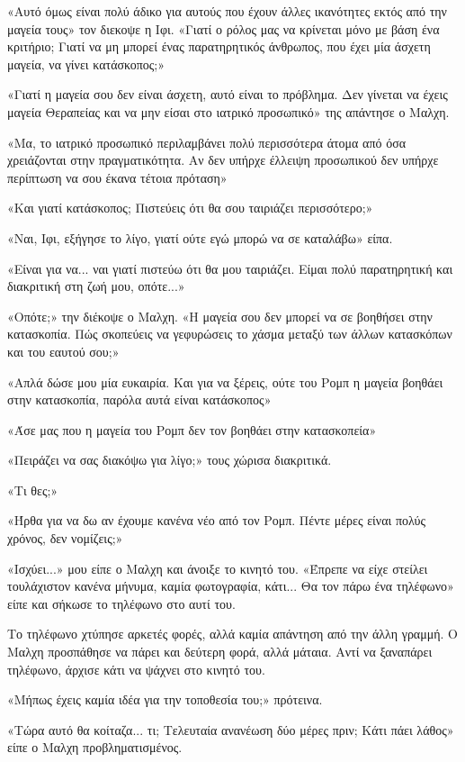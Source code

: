 \documentclass[12pt,twoside, openany]{book}
\begin{document}
«Αυτό όμως είναι πολύ άδικο για αυτούς που έχουν άλλες ικανότητες εκτός από την μαγεία τους» τον διεκοψε η Ιφι. «Γιατί ο ρόλος μας να κρίνεται μόνο με βάση ένα κριτήριο; Γιατί να μη μπορεί ένας παρατηρητικός άνθρωπος, που έχει μία άσχετη μαγεία, να γίνει κατάσκοπος;»

«Γιατί η μαγεία σου δεν είναι άσχετη, αυτό είναι το πρόβλημα. Δεν γίνεται να έχεις μαγεία Θεραπείας και να μην είσαι στο ιατρικό προσωπικό» της απάντησε ο Μαλχη.

«Μα, το ιατρικό προσωπικό περιλαμβάνει πολύ περισσότερα άτομα από όσα χρειάζονται στην πραγματικότητα. Αν δεν υπήρχε έλλειψη προσωπικού δεν υπήρχε περίπτωση να σου έκανα τέτοια πρόταση»

«Και γιατί κατάσκοπος; Πιστεύεις ότι θα σου ταιριάζει περισσότερο;»

«Ναι, Ιφι, εξήγησε το λίγο, γιατί ούτε εγώ μπορώ να σε καταλάβω» είπα.

«Είναι για να... ναι γιατί πιστεύω ότι θα μου ταιριάζει. Είμαι πολύ παρατηρητική και διακριτική στη ζωή μου, οπότε...»

«Οπότε;» την διέκοψε ο Μαλχη. «Η μαγεία σου δεν μπορεί να σε βοηθήσει στην κατασκοπία. Πώς σκοπεύεις να γεφυρώσεις το χάσμα μεταξύ των άλλων κατασκόπων και του εαυτού σου;»

«Απλά δώσε μου μία ευκαιρία. Και για να ξέρεις, ούτε του Ρομπ η μαγεία βοηθάει στην κατασκοπία, παρόλα αυτά είναι κατάσκοπος»

«Άσε μας που η μαγεία του Ρομπ δεν τον βοηθάει στην κατασκοπεία»

«Πειράζει να σας διακόψω για λίγο;» τους χώρισα διακριτικά.

«Τι θες;»

«Ήρθα για να δω αν έχουμε κανένα νέο από τον Ρομπ. Πέντε μέρες είναι πολύς χρόνος, δεν νομίζεις;»

«Ισχύει...» μου είπε ο Μαλχη και άνοιξε το κινητό του. «Έπρεπε να είχε στείλει τουλάχιστον κανένα μήνυμα, καμία φωτογραφία, κάτι... Θα τον πάρω ένα τηλέφωνο» είπε και σήκωσε το τηλέφωνο στο αυτί του.

Το τηλέφωνο χτύπησε αρκετές φορές, αλλά καμία απάντηση από την άλλη γραμμή. Ο Μαλχη προσπάθησε να πάρει και δεύτερη φορά, αλλά μάταια. Αντί να ξαναπάρει τηλέφωνο, άρχισε κάτι να ψάχνει στο κινητό του.

«Μήπως έχεις καμία ιδέα για την τοποθεσία του;» πρότεινα.

«Τώρα αυτό θα κοίταζα... τι; Τελευταία ανανέωση δύο μέρες πριν; Κάτι πάει λάθος» είπε ο Μαλχη προβληματισμένος.
\end{document}
